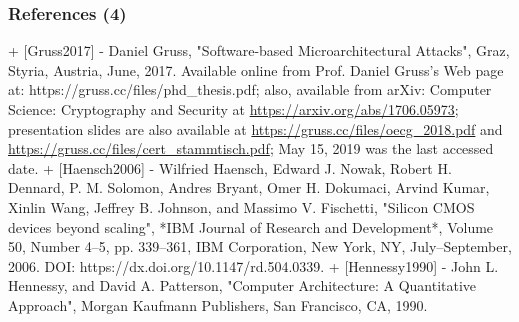 \documentclass[xcolor={usenames,dvipsnames},hyperref={hyperindex,bookmarks}]{beamer}
\begin{document}
\begin{frame}
	\frametitle{References (4)}

+ [Gruss2017]
	- Daniel Gruss, "Software-based Microarchitectural Attacks", Graz, Styria, Austria, June, 2017. Available online from Prof. Daniel Gruss's Web page at: https://gruss.cc/files/phd_thesis.pdf; also, available from arXiv: Computer Science: Cryptography and Security at \url{https://arxiv.org/abs/1706.05973}; presentation slides are also available at \url{https://gruss.cc/files/oecg_2018.pdf} and \url{https://gruss.cc/files/cert_stammtisch.pdf}; May 15, 2019 was the last accessed date.
+ [Haensch2006]
	- Wilfried Haensch, Edward J. Nowak, Robert H. Dennard, P. M. Solomon, Andres Bryant, Omer H. Dokumaci, Arvind Kumar, Xinlin Wang, Jeffrey B. Johnson, and Massimo V. Fischetti, "Silicon {CMOS} devices beyond scaling", *{IBM} Journal of Research and Development*, Volume 50, Number 4--5, pp. 339--361, {IBM} Corporation, New York, {NY}, July--September, 2006. DOI: https://dx.doi.org/10.1147/rd.504.0339.
+ [Hennessy1990]
	- John L. Hennessy, and David A. Patterson, "Computer Architecture: A Quantitative Approach", Morgan Kaufmann Publishers, San Francisco, {CA}, 1990.



\end{frame}
\end{document}
